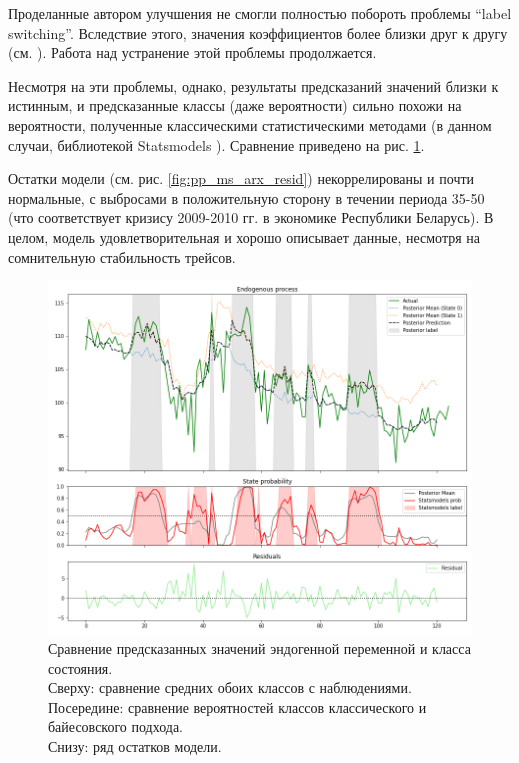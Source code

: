 \documentclass[a4paper,14pt]{extreport}
\begin{document}
Проделанные автором улучшения не смогли полностью побороть проблемы ``label switching''. Вследствие этого, значения коэффициентов более близки друг к другу (см. ). Работа над устранение этой проблемы продолжается. 

Несмотря на эти проблемы, однако, результаты предсказаний значений близки к истинным, и предсказанные классы (даже вероятности) сильно похожи на вероятности, полученные классическими статистическими методами (в данном случаи, библиотекой Statsmodels \cite{statsmodels}). Сравнение приведено на рис. \ref{fig:pp_ms_arx_fit}.

Остатки модели (см. рис. \ref{fig:pp_ms_arx_resid}) некоррелированы и почти нормальные, с выбросами в положительную сторону в течении периода 35-50 (что соответствует кризису 2009-2010 гг. в экономике Республики Беларусь). В целом, модель удовлетворительная и хорошо описывает данные, несмотря на сомнительную стабильность трейсов.

\begin{figure}[H]
	\includegraphics[width=\linewidth]{img/gen/pp_ms_arx_fit.png}
	\caption{
		Сравнение предсказанных значений эндогенной переменной и класса состояния. \\
		Сверху: сравнение средних обоих классов с наблюдениями. \\
		Посередине: сравнение вероятностей классов классического и байесовского подхода. \\
		Снизу: ряд остатков модели.
	}
	\label{fig:pp_ms_arx_fit}
\end{figure}
\end{document}
